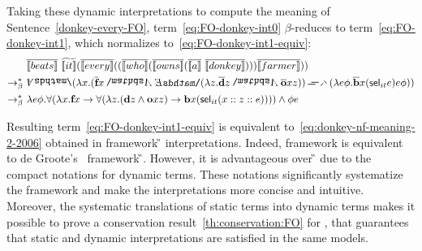  Taking these dynamic interpretations to compute the meaning of Sentence~\eqref{donkey-every-FO}, term~\eqref{eq:FO-donkey-int0} $\beta$-reduces to term~\eqref{eq:FO-donkey-int1}, which normalizes to~\eqref{eq:FO-donkey-int1-equiv}:
\begin{align}
& \tr{\I{beats}}  \ \etr{\I{it}} (\tr{\I{every}}  ((\tr{\I{who}}  (\tr{\I{owns}}  (\tr{\I{a}} \ \tr{\I{donkey}} ) ) ) \tr{\I{farmer}}  ))  \label{eq:FO-donkey-int0} \\
\bred \ &  \all2 (\lambda \x1. (\tr{\textbf{f}} \x1  \cnj2     \ex2 (\lambda \z1.   \tr{\textbf{d}}   \z1  \cnj2      \tr{\textbf{o}}  \x1  \z1 ))    \imp2    (\lambda e \phi. \tr{\textbf{b}}  \x1 ( \sel_{it} e ) e \phi ) )  \label{eq:FO-donkey-int1} \\
\bred \ & \lambda e \phi. \forall (\lambda \x1. \cfarmer \x1  \rightarrow \forall  (\lambda \z1.  (\cdonkey  \z1 \land \cown  \x1 \z1 )   \rightarrow  \cbeat  \x1 ( \sel_{it}  (\upii{\x1}{\upii{\z1}{e}}) )))\land \phi e  \label{eq:FO-donkey-int1-equiv}
\end{align}


Resulting term~\eqref{eq:FO-donkey-int1-equiv} is equivalent to~\eqref{eq:donkey-nf-meaning-2-2006} obtained in framework {\G} interpretations. Indeed, framework {\GN} is equivalent to de Groote's~\cite{deGroote:2006:Towards-a-Montagovian-Account-of-Dynamics} framework {\G}. However, it is advantageous over {\G} due to the compact notations for dynamic terms. These notations significantly systematize the framework and make the interpretations more concise and intuitive. Moreover, the systematic translations of static terms into dynamic terms makes it possible to prove a conservation result~\ref{th:conservation:FO} for {\GN}, that guarantees that static and dynamic interpretations are satisfied in the same models. 




